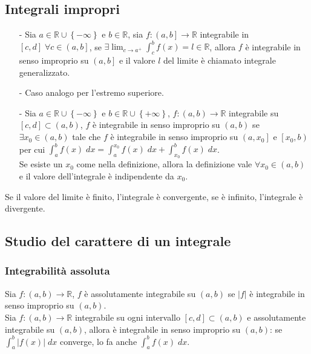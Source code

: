 \documentclass[a4paper]{article}
\begin{document}
\subsection{Integrali impropri}
\begin{itemize}
	\item[-] Sia \(a \in \mathbb{R} \cup \left\{-\infty\right\}\) e \(b \in \mathbb{R}\), sia \(f:\left(a, b\right] \to \mathbb{R}\) integrabile in \(\left[c, d\right] \; \forall c \in \left(a, b\right]\),
	se \(\displaystyle \exists \lim_{c \to a^+} \int_{c}^{b} f(x) = l \in \mathbb{R}\), allora \(f\) è integrabile in senso improprio su \(\left(a, b\right]\) e il valore \(l\) del limite
	è chiamato integrale generalizzato.
	\item[-] Caso analogo per l'estremo superiore.
	\item[-] Sia \(a \in \mathbb{R} \cup \left\{-\infty\right\}\) e \(b \in \mathbb{R} \cup \left\{+\infty\right\}\), \(f:\left(a, b\right) \to \mathbb{R}\) integrabile su \(\left[c, d\right] \subset \left(a, b\right)\),
	\(f\) è integrabile in senso improprio su \(\left(a, b\right)\) se \(\exists x_0 \in \left(a, b\right)\) tale che \(f\) è integrabile in senso improprio su \(\left(a, x_0\right]\) e \(\left[x_0, b\right)\) per cui
	\(\displaystyle \int_{a}^{b} f(x) \; dx = \int_{a}^{x_0} f(x) \; dx + \int_{x_0}^{b} f(x) \; dx\). \\
	Se esiste un \(x_0\) come nella definizione, allora la definizione vale \(\forall x_0 \in \left(a, b\right)\) e il valore dell'integrale è indipendente da \(x_0\).
\end{itemize}

Se il valore del limite è finito, l'integrale è convergente, se è infinito, l'integrale è divergente.

\subsection{Studio del carattere di un integrale}
\subsubsection*{Integrabilità assoluta}
Sia \(f:\left(a, b\right) \to \mathbb{R}\), \(f\) è assolutamente integrabile su \(\left(a, b\right)\) se \(\left|f\right|\) è integrabile in senso improprio su \(\left(a, b\right)\). \\
Sia \(f:\left(a, b\right) \to \mathbb{R}\) integrabile su ogni intervallo \(\left[c, d\right] \subset \left(a, b\right)\) e assolutamente integrabile su \(\left(a, b\right)\),
allora è integrabile in senso improprio su \(\left(a, b\right)\): se \(\displaystyle \int_{a}^{b} \left|f(x)\right| \; dx\) converge, lo fa anche \(\displaystyle \int_{a}^{b} f(x) \; dx\).
\end{document}

